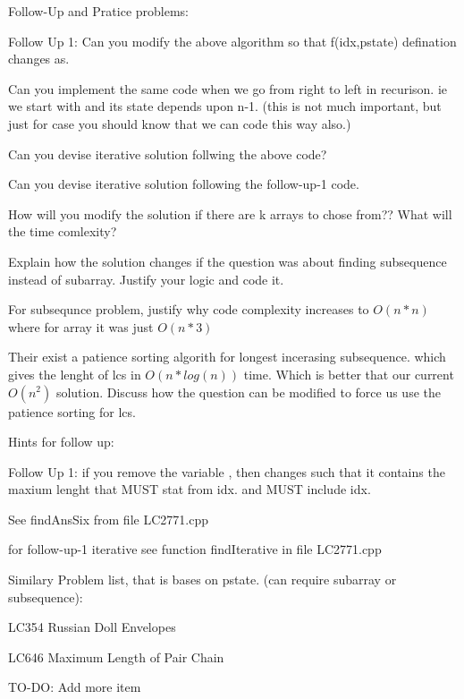 \begin{pratice}
    Follow-Up and  Pratice problems:
    \begin{asparaenum}[(a)]
        \item Follow Up 1: Can you modify the above algorithm so that f(idx,pstate) defination changes as.  
        \item Can you implement the same code when we go from right to left in recurison. ie we start with  and its state depends upon n-1. (this is not much important, but just for case you should know that we can code this way also.)
        
        \item Can you devise iterative solution follwing the above code?
        \item Can you devise iterative solution following the follow-up-1 code.
        
        \item How will you modify the solution if there are k arrays to chose from?? What will the time comlexity?
        \item Explain how the solution changes if the question was about finding subsequence instead of subarray. Justify your logic and  code it.
        \item For subsequnce problem, justify why code complexity increases to $O(n*n)$ where for array it was just $O(n*3)$
        \item Their exist a patience sorting algorith for longest incerasing subsequence. which gives the lenght of lcs in $O(n*log(n))$ time. Which is better that our current $O(n^2)$ solution. Discuss how the question can be modified to force us use the patience sorting for lcs.
    \end{asparaenum}
\end{pratice}

\vspace{1cm}
\begin{pratice}
    Hints for follow up:
    \begin{asparaenum}[(a)]
        \item Follow Up 1: if you remove the variable ,  then  changes such that it contains the maxium lenght that MUST stat from idx. and MUST include idx. 
        \item See findAnsSix from file LC2771.cpp
        \item for follow-up-1 iterative see function findIterative in file LC2771.cpp
    \end{asparaenum}
\end{pratice}

\begin{pratice}
    Similary Problem list, that is bases on pstate. (can require subarray or subsequence):
    \begin{asparaenum}
        \item LC354 Russian Doll Envelopes
        \item LC646 Maximum Length of Pair Chain
        \item TO-DO: Add more item
    \end{asparaenum}
\end{pratice}